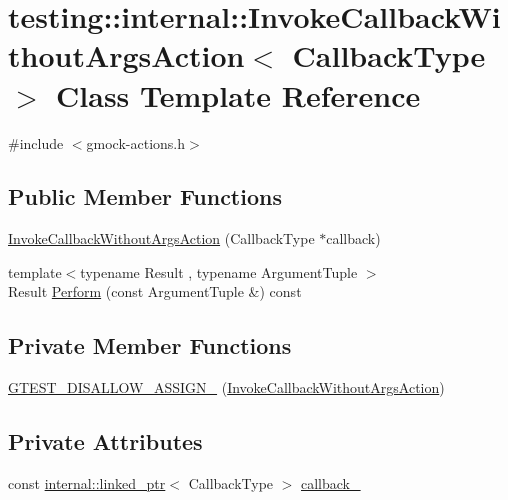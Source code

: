 \hypertarget{classtesting_1_1internal_1_1_invoke_callback_without_args_action}{}\section{testing\+::internal\+::Invoke\+Callback\+Without\+Args\+Action$<$ Callback\+Type $>$ Class Template Reference}
\label{classtesting_1_1internal_1_1_invoke_callback_without_args_action}


{\ttfamily \#include $<$gmock-\/actions.\+h$>$}

\subsection*{Public Member Functions}
\begin{DoxyCompactItemize}
\item 
\mbox{\hyperlink{classtesting_1_1internal_1_1_invoke_callback_without_args_action_a333d0b92596759753cf78dc98ee7e270}{Invoke\+Callback\+Without\+Args\+Action}} (Callback\+Type $\ast$callback)
\item 
{\footnotesize template$<$typename Result , typename Argument\+Tuple $>$ }\\Result \mbox{\hyperlink{classtesting_1_1internal_1_1_invoke_callback_without_args_action_ac43b186c6daa5f21c8377678c6a9d4ba}{Perform}} (const Argument\+Tuple \&) const
\end{DoxyCompactItemize}
\subsection*{Private Member Functions}
\begin{DoxyCompactItemize}
\item 
\mbox{\hyperlink{classtesting_1_1internal_1_1_invoke_callback_without_args_action_a069ae967ff8fb159825d612aacaa5616}{G\+T\+E\+S\+T\+\_\+\+D\+I\+S\+A\+L\+L\+O\+W\+\_\+\+A\+S\+S\+I\+G\+N\+\_\+}} (\mbox{\hyperlink{classtesting_1_1internal_1_1_invoke_callback_without_args_action}{Invoke\+Callback\+Without\+Args\+Action}})
\end{DoxyCompactItemize}
\subsection*{Private Attributes}
\begin{DoxyCompactItemize}
\item 
const \mbox{\hyperlink{classtesting_1_1internal_1_1linked__ptr}{internal\+::linked\+\_\+ptr}}$<$ Callback\+Type $>$ \mbox{\hyperlink{classtesting_1_1internal_1_1_invoke_callback_without_args_action_a4da1a28e964fd7eeabadab7ca82c79c2}{callback\+\_\+}}
\end{DoxyCompactItemize}


